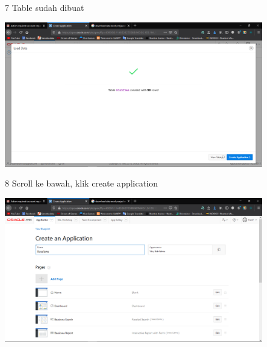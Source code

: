\begin{enumerate}
\begin{figure}[!htbp]    
\item[7] Table sudah dibuat
\begin{center}
    \includegraphics[scale=0.3]{section/Screenshot(34).png}
    \end{center}
    \end{figure}
    
\begin{figure}[!htbp]
\item[8] Scroll ke bawah, klik create application
\begin{center}
    \includegraphics[scale=0.3]{section/Screenshot(35).png}
    \end{center}
    \end{figure}
    

\end{enumerate}
